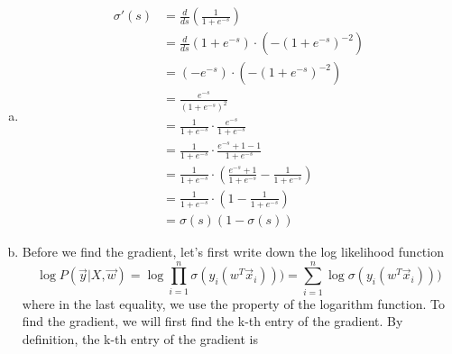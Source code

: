\documentclass{article}
\begin{document}
\section{}
\begin{enumerate}[(a)]
	\item
	\begin{align*}
		\sigma ' (s)  &=\frac{d}{ds} (\frac{1}{1+e^{-s}}) \\
		&=\frac{d}{ds} (1+e^{-s})\cdot (- (1 + e^{-s})^{-2}) \\
		&=(-e^{-s})\cdot (- (1 + e^{-s})^{-2}) \\
		&=\frac{e^{-s}}{(1 + e^{-s})^2} \\
		&=\frac{1}{1 + e^{-s}} \cdot \frac{e^{-s}}{1 + e^{-s}}\\
		&=\frac{1}{1 + e^{-s}} \cdot \frac{e^{-s} + 1 - 1}{1 + e^{-s}}\\
		&=\frac{1}{1 + e^{-s}} \cdot (\frac{e^{-s} + 1}{1 + e^{-s}} - \frac{1}{1+e^{-s}})\\
		&=\frac{1}{1 + e^{-s}} \cdot (1 - \frac{1}{1+e^{-s}})\\
		&= \sigma(s)(1-\sigma (s))
	\end{align*}

    \item Before we find the gradient, let's first write down the log likelihood function
    $$\log P(\vec{y} | X, \vec{w}) = \log \prod_{i = 1}^{n} \sigma(y_i(w^T\vec{x}_i))) = \sum_{i = 1}^{n} \log \sigma(y_i(w^T\vec{x}_i)))$$ 
    where in the last equality, we use the property of the logarithm function. To find the gradient, we will first find the k-th entry of the gradient. By definition, the k-th entry of the gradient is 
    

\end{enumerate}
\end{document}
